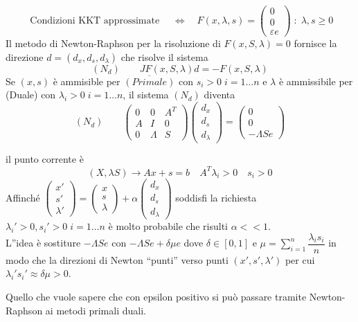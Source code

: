 $$
\text{ Condizioni KKT approssimate } \quad \Longleftrightarrow \quad
 F(x, \lambda , s) =
\begin{pmatrix}
  0 \\
 0 \\
 \varepsilon e
\end{pmatrix}\; : \; \lambda, s \geq 0
$$
Il metodo di Newton-Raphson per la risoluzione di $F(x, S, \lambda) = 0$
fornisce la direzione $d = (d_x, d_s, d_{\lambda})$ che risolve il sistema
$$(N_d) \qquad JF( x, S, \lambda) d = - F(x, S , \lambda)$$
Se $(x,s)$ \`e ammisible per $\overline{(Primale)}$ con $s_i > 0 \; i=1\ldots n$
e $\lambda$ \`e ammissibile per (Duale) con $\lambda_i > 0 \; i = 1\ldots n$,
il sistema $(N_d)$ diventa
$$
(N_d) \qquad
\begin{pmatrix}
  0 & 0 & A^{T}   \\
  A & I & 0  \\
  0 & \Lambda & S 
\end{pmatrix}
\begin{pmatrix}
d_x \\
d_{s} \\
d_{\lambda}
\end{pmatrix}
=
\begin{pmatrix}
  0 \\
  0 \\
 - \Lambda Se
\end{pmatrix}
$$

il punto corrente \`e
$$ (X, \lambda S) \rightarrow Ax +s = b \quad A^{T} \lambda_i > 0
\quad s_i > 0
$$
Affinch\'e
$
\begin{pmatrix}
  x'  \\
 s' \\
 \lambda'
\end{pmatrix}
=
\begin{pmatrix}
  x \\
 s \\
 \lambda 
\end{pmatrix}
+
\alpha
\begin{pmatrix}
  d_x \\
 d_s \\
 d_{\lambda}
\end{pmatrix}
$
soddisfi la richiesta $\lambda_i' > 0, s_i' > 0 \;
i =1 \ldots n$  \`e molto probabile che risulti
$\alpha <<1 $. \\
L''idea \`e sostiture
$ - \Lambda S e$ con $-\Lambda Se + \delta \mu e$
dove $\delta \in [0,1]$ e
$ \mu = \displaystyle \sum_{i=1}^{n} \dfrac{\lambda_i s_i}{n}$
in modo che la direzioni di Newton ``punti'' verso punti
$(x', s', \lambda ')$ per cui $\lambda_i' s_i' \approx \delta \mu > 0$.
\begin{notes}
Quello che vuole sapere che con epsilon positivo si pu\`o passare
tramite Newton-Raphson ai metodi primali duali.
\end{notes}
